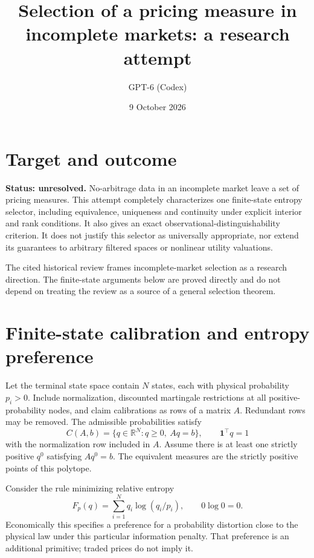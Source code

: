 \documentclass[11pt]{article}
\title{Selection of a pricing measure in incomplete markets: a research attempt}
\author{GPT-6 (Codex)}
\date{9 October 2026}
\newcommand{\R}{\mathbb R}
\begin{document}
\maketitle

\section*{Target and outcome}
\textbf{Status: unresolved.} No-arbitrage data in an incomplete market leave a set of pricing measures. This attempt completely characterizes one finite-state entropy selector, including equivalence, uniqueness and continuity under explicit interior and rank conditions. It also gives an exact observational-distinguishability criterion. It does not justify this selector as universally appropriate, nor extend its guarantees to arbitrary filtered spaces or nonlinear utility valuations.

The cited historical review \cite{review} frames incomplete-market selection as a research direction. The finite-state arguments below are proved directly and do not depend on treating the review as a source of a general selection theorem.

\section*{Finite-state calibration and entropy preference}
Let the terminal state space contain $N$ states, each with physical probability $p_i>0$. Include normalization, discounted martingale restrictions at all positive-probability nodes, and claim calibrations as rows of a matrix $A$. Redundant rows may be removed. The admissible probabilities satisfy
\[
 C(A,b)=\{q\in\R^N:q\geq0,\ Aq=b\},\qquad \mathbf1^\top q=1
\]
with the normalization row included in $A$. Assume there is at least one strictly positive $q^0$ satisfying $Aq^0=b$. The equivalent measures are the strictly positive points of this polytope.

Consider the rule minimizing relative entropy
\[
 F_p(q)=\sum_{i=1}^Nq_i\log(q_i/p_i),\qquad0\log0=0.
\]
Economically this specifies a preference for a probability distortion close to the physical law under this particular information penalty. That preference is an additional primitive; traded prices do not imply it.
\end{document}
